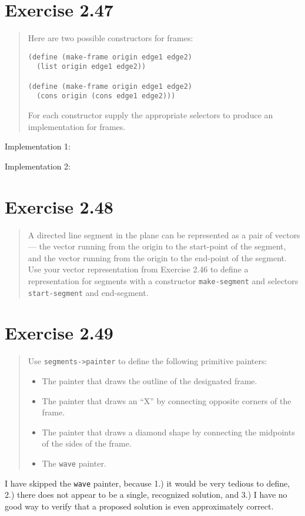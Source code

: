 \documentclass{article}
\begin{document}


\section{Exercise 2.47}
\begin{quote}
    Here are two possible constructors for frames:
    \begin{lstlisting}
(define (make-frame origin edge1 edge2)
  (list origin edge1 edge2))

(define (make-frame origin edge1 edge2)
  (cons origin (cons edge1 edge2)))
    \end{lstlisting}
    For each constructor supply the appropriate selectors to produce an
    implementation for frames.
\end{quote}

Implementation 1:


Implementation 2:


\section{Exercise 2.48}
\begin{quote}
    A directed line segment in the plane can be represented as a pair of
    vectors --- the vector running from the origin to the start-point of the
    segment, and the vector running from the origin to the end-point of the
    segment. Use your vector representation from Exercise 2.46 to define a
    representation for segments with a constructor \texttt{make-segment} and
    selectors \texttt{start-segment} and end-segment.
\end{quote}



\section{Exercise 2.49}
\begin{quote}
    Use \texttt{segments->painter} to define the following primitive painters:
    \begin{itemize}
        \item The painter that draws the outline of the designated frame.
        \item The painter that draws an “X” by connecting opposite corners of
            the frame.
        \item The painter that draws a diamond shape by connecting
            the midpoints of the sides of the frame.
        \item The \texttt{wave} painter.
    \end{itemize}
\end{quote}



I have skipped the \texttt{wave} painter, because 1.) it would be very tedious
to define, 2.) there does not appear to be a single, recognized solution, and
3.) I have no good way to verify that a proposed solution is even approximately
correct.
\end{document}
